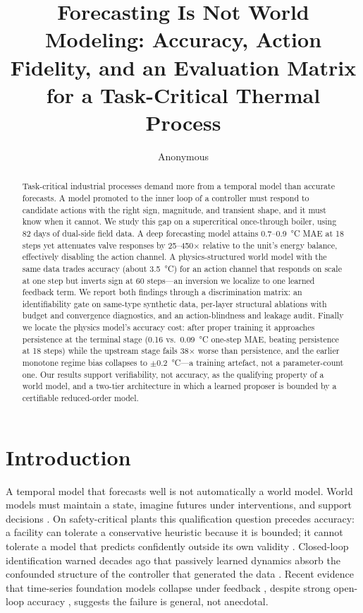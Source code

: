 \documentclass{article}
\title{Forecasting Is Not World Modeling: Accuracy, Action Fidelity, and an Evaluation Matrix for a Task-Critical Thermal Process}
\author{Anonymous}
\begin{document}
\maketitle

\begin{abstract}
Task-critical industrial processes demand more from a temporal model than accurate
forecasts. A model promoted to the inner loop of a controller must respond to candidate
actions with the right sign, magnitude, and transient shape, and it must know when it
cannot. We study this gap on a supercritical once-through boiler, using 82 days of
dual-side field data. A deep forecasting model attains 0.7--0.9~\si{\degreeCelsius} MAE at
18 steps yet attenuates valve responses by 25--450$\times$ relative to the unit's energy
balance, effectively disabling the action channel. A physics-structured world model with
the same data trades accuracy (about 3.5~\si{\degreeCelsius}) for an action channel
that responds on scale at one step but inverts sign at 60 steps---an inversion we
localize to one learned feedback term. We report both findings through a discrimination
matrix:
an identifiability gate on same-type synthetic data, per-layer structural ablations with
budget and convergence diagnostics, and an action-blindness and leakage
audit. Finally we locate the physics model's accuracy cost: after proper training it
approaches persistence at the terminal stage (0.16 vs.\ 0.09~\si{\degreeCelsius}
one-step MAE, beating persistence at 18 steps) while the upstream stage fails
38$\times$ worse than persistence, and the earlier monotone regime bias collapses to
$\pm$0.2~\si{\degreeCelsius}---a training artefact, not a parameter-count one. Our
results support verifiability, not accuracy, as the qualifying property of a world
model, and a two-tier architecture in which a learned proposer is bounded by a
certifiable reduced-order model.
\end{abstract}

\section{Introduction}

A temporal model that forecasts well is not automatically a world model. World models
must maintain a state, imagine futures under interventions, and support decisions
\cite{ha2018world, hafner2023dreamerv3, ding2024understanding}. On safety-critical
plants this qualification question precedes accuracy: a facility can tolerate a
conservative heuristic because it is bounded; it cannot tolerate a model that predicts
confidently outside its own validity \cite{ghosh2026rom}. Closed-loop identification
warned decades ago that passively learned dynamics absorb the confounded structure of
the controller that generated the data \cite{forssell1999closedloop}. Recent evidence
that time-series foundation models collapse under feedback \cite{wan2026forecast},
despite strong open-loop accuracy \cite{ansari2024chronos, das2024timesfm}, suggests
the failure is general, not anecdotal.
\end{document}
